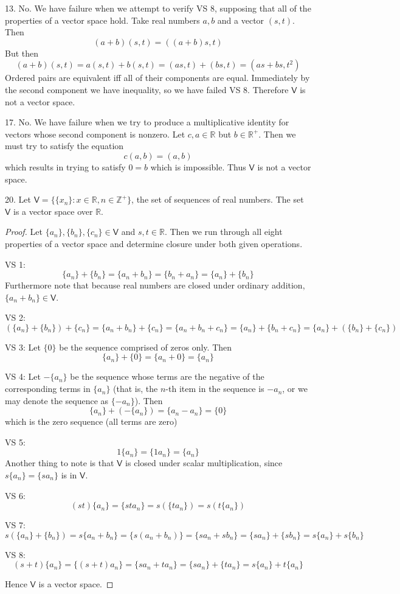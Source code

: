 \documentclass[11pt]{article}
\newcommand{\br}[1]{\left(#1\right)}
\newcommand{\cbr}[1]{\{#1\}}
\begin{document}
13. No. We have failure when we attempt to verify VS 8, supposing that all of the properties of a vector space hold. Take real numbers $a,b$ and a vector $(s,t)$. Then $$(a+b)(s,t) = ((a+b)s,t)$$
But then $$(a+b)(s,t) = a(s,t)+b(s,t) = (as,t) + (bs,t) = (as+bs,t^2)$$ Ordered pairs are equivalent iff all of their components are equal. Immediately by the second component we have inequality, so we have failed VS 8. Therefore $\mathsf{V}$ is not a vector space.

17. No. We have failure when we try to produce a multiplicative identity for vectors whose second component is nonzero. Let $c,a\in\mathbb{R}$ but $b\in\mathbb{R}^{+}$. Then we must try to satisfy the equation $$c(a,b) = (a,b)$$ which results in trying to satisfy $0=b$ which is impossible. Thus $\mathsf{V}$ is not a vector space.

20. Let $\mathsf{V} = \cbr{\cbr{x_n}: x\in\mathbb{R}, n\in\mathbb{Z}^{+}}$, the set of sequences of real numbers. The set $\mathsf{V}$ is a vector space over $\mathbb{R}$.

\begin{proof}
    Let $\cbr{a_n}, \cbr{b_n}, \cbr{c_n}\in\mathsf{V}$ and $s,t\in\mathbb{R}$. Then we run through all eight properties of a vector space and determine closure under both given operations.

    VS 1: $$\cbr{a_n}+ \cbr{b_n} = \cbr{a_n+b_n} = \cbr{b_n+a_n} = \cbr{a_n}+ \cbr{b_n}$$ Furthermore note that because real numbers are closed under ordinary addition, $\cbr{a_n+b_n}\in\mathsf{V}$.

    VS 2: $$\br{\cbr{a_n}+ \cbr{b_n}}+ \cbr{c_n} = \cbr{a_n+b_n}+ \cbr{c_n} = \cbr{a_n+b_n+c_n} = \cbr{a_n}+ \cbr{b_n+c_n} = \cbr{a_n}+ \br{\cbr{b_n}+ \cbr{c_n}}$$

    VS 3: Let $\cbr{0}$ be the sequence comprised of zeros only. Then $$\cbr{a_n}+\cbr{0} = \cbr{a_n+0} = \cbr{a_n}$$

    VS 4: Let $-\cbr{a_n}$ be the sequence whose terms are the negative of the corresponding terms in $\cbr{a_n}$ (that is, the $n$-th item in the sequence is $-a_n$, or we may denote the sequence as $\cbr{-a_n}$). Then $$\cbr{a_n} + \br{-\cbr{a_n}} = \cbr{a_n-a_n} = \cbr{0}$$ which is the zero sequence (all terms are zero)

    VS 5: $$1\cbr{a_n} = \cbr{1a_n} = \cbr{a_n}$$ Another thing to note is that $\mathsf{V}$ is closed under scalar multiplication, since $s\cbr{a_n} = \cbr{sa_n}$ is in $\mathsf{V}$.

    VS 6: $$\br{st}\cbr{a_n} = \cbr{sta_n} = s\br{\cbr{ta_n}} = s\br{t\cbr{a_n}}$$

    VS 7: $$s\br{\cbr{a_n}+\cbr{b_n}} = s\cbr{a_n+b_n} = \cbr{s\br{a_n+b_n}} = \cbr{sa_n+sb_n} = \cbr{sa_n} + \cbr{sb_n} = s\cbr{a_n} + s\cbr{b_n}$$

    VS 8: $$\br{s+t}\cbr{a_n} = \cbr{\br{s+t}a_n} = \cbr{sa_n+ta_n} = \cbr{sa_n}+\cbr{ta_n} = s\cbr{a_n}+t\cbr{a_n}$$

    Hence $\mathsf{V}$ is a vector space.
\end{proof}
\end{document}
